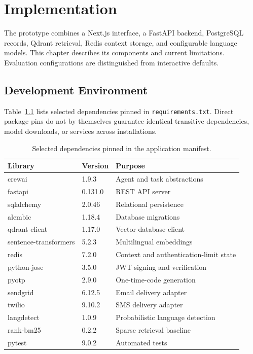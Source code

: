 \chapter{Implementation}
\label{chap:implementation}

The prototype combines a Next.js interface, a FastAPI backend, PostgreSQL
records, Qdrant retrieval, Redis context storage, and configurable language
models. This chapter describes its components and current limitations.
Evaluation configurations are distinguished from interactive defaults.

\section{Development Environment}
\label{sec:impl-method}

Table~\ref{tab:ch4-deps} lists selected dependencies pinned in
\texttt{requirements.txt}. Direct package pins do not by themselves
guarantee identical transitive dependencies, model downloads, or services
across installations.

\begin{table}[htbp]
\centering
\caption{Selected dependencies pinned in the application manifest.}
\label{tab:ch4-deps}
\small
\begin{tabularx}{\textwidth}{@{}l l X@{}}
\toprule
\textbf{Library} & \textbf{Version} & \textbf{Purpose} \\
\midrule
crewai & 1.9.3 & Agent and task abstractions \\
fastapi & 0.131.0 & REST API server \\
sqlalchemy & 2.0.46 & Relational persistence \\
alembic & 1.18.4 & Database migrations \\
qdrant-client & 1.17.0 & Vector database client \\
sentence-transformers & 5.2.3 & Multilingual embeddings \\
redis & 7.2.0 & Context and authentication-limit state \\
python-jose & 3.5.0 & JWT signing and verification \\
pyotp & 2.9.0 & One-time-code generation \\
sendgrid & 6.12.5 & Email delivery adapter \\
twilio & 9.10.2 & SMS delivery adapter \\
langdetect & 1.0.9 & Probabilistic language detection \\
rank-bm25 & 0.2.2 & Sparse retrieval baseline \\
pytest & 9.0.2 & Automated tests \\
\bottomrule
\end{tabularx}
\end{table}

